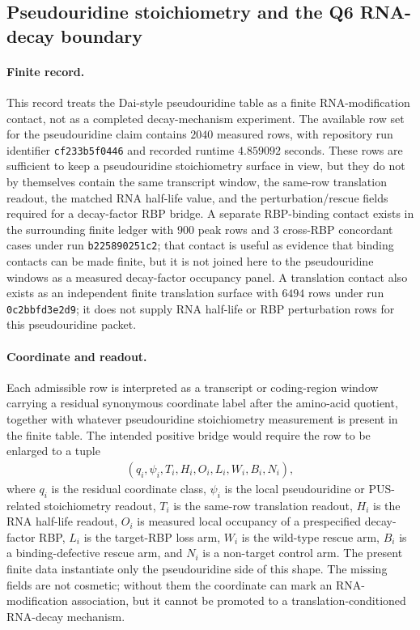 \subsection{Pseudouridine stoichiometry and the Q6 RNA-decay boundary}\label{subsec:bioreality-pseudouridine-pus-q6-rna-decay-boundary}

\paragraph{Finite record.}
This record treats the Dai-style pseudouridine table as a finite RNA-modification contact, not as a completed decay-mechanism experiment.  The available row set for the pseudouridine claim contains $2040$ measured rows, with repository run identifier \texttt{cf233b5f0446} and recorded runtime $4.859092$ seconds.  These rows are sufficient to keep a pseudouridine stoichiometry surface in view, but they do not by themselves contain the same transcript window, the same-row translation readout, the matched RNA half-life value, and the perturbation/rescue fields required for a decay-factor RBP bridge.  A separate RBP-binding contact exists in the surrounding finite ledger with $900$ peak rows and $3$ cross-RBP concordant cases under run \texttt{b225890251c2}; that contact is useful as evidence that binding contacts can be made finite, but it is not joined here to the pseudouridine windows as a measured decay-factor occupancy panel.  A translation contact also exists as an independent finite translation surface with $6494$ rows under run \texttt{0c2bbfd3e2d9}; it does not supply RNA half-life or RBP perturbation rows for this pseudouridine packet.

\paragraph{Coordinate and readout.}
Each admissible row is interpreted as a transcript or coding-region window carrying a residual synonymous coordinate label after the amino-acid quotient, together with whatever pseudouridine stoichiometry measurement is present in the finite table.  The intended positive bridge would require the row to be enlarged to a tuple
$$
\begin{aligned}
(q_i,\psi_i,T_i,H_i,O_i,L_i,W_i,B_i,N_i),
\end{aligned}
$$
where $q_i$ is the residual coordinate class, $\psi_i$ is the local pseudouridine or PUS-related stoichiometry readout, $T_i$ is the same-row translation readout, $H_i$ is the RNA half-life readout, $O_i$ is measured local occupancy of a prespecified decay-factor RBP, $L_i$ is the target-RBP loss arm, $W_i$ is the wild-type rescue arm, $B_i$ is a binding-defective rescue arm, and $N_i$ is a non-target control arm.  The present finite data instantiate only the pseudouridine side of this shape.  The missing fields are not cosmetic; without them the coordinate can mark an RNA-modification association, but it cannot be promoted to a translation-conditioned RNA-decay mechanism.

